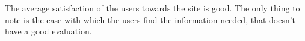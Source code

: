 \begin{center}
\end{center}

The average satisfaction of the users towards the site is good. The only thing to note is the ease with which the users find the information needed, that doesn't have a good evaluation.


